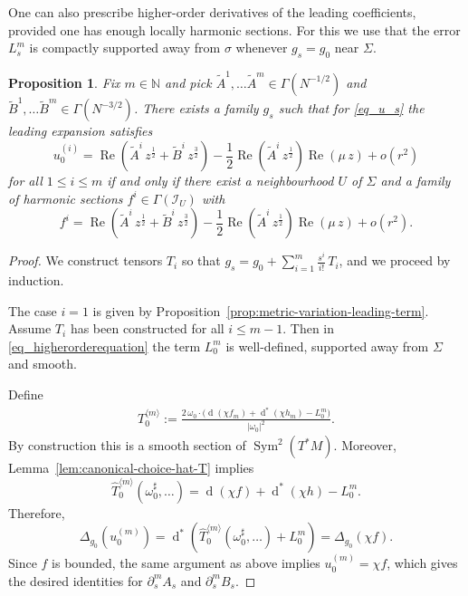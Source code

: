 \documentclass[11pt]{amsart}
\newcommand{\N}{\mathbb{N}}
\newcommand{\Sym}{\operatorname{Sym}}
\renewcommand{\d}{\operatorname{d}}
\renewcommand{\Re}{\operatorname{Re}}
\newtheorem{proposition}[theorem]{Proposition}
\begin{document}
One can also prescribe higher-order derivatives of the leading coefficients, provided one has enough locally harmonic sections. For this we use that the error $L^m_s$ is compactly supported away from $\sigma$ whenever $g_s = g_0$ near $\Sigma$.

\begin{proposition}
	\label{prop:higher-order-variation}
	Fix $m \in \N$ and pick \(\widetilde A^1, \ldots \widetilde A^m \in \Gamma(N^{-1/2})\) and \(\widetilde B^1, \ldots \widetilde B^m\in \Gamma(N^{-3/2})\). There exists a family \(g_s\) such that for \eqref{eq_u_s} the leading expansion satisfies
	\[
	u_0^{(i)} = \Re \left(\widetilde{A}^i \, z^{\frac{1}{2}} + \widetilde{B}^i \, z^{\frac{3}{2}}\right)
	- \frac{1}{2} \Re \left( \widetilde{A}^i\, z^{\frac{1}{2}}\right) \Re \left( \mu \, z\right)
	+ o(r^2)
	\]
	for all $1 \le i \le m$
	if and only if there exist a neighbourhood \(U\) of \(\Sigma\) and a family of harmonic sections \(f^i\in \Gamma(\mathcal I_U)\) with
	\[
	f^i = \Re \left(\widetilde A^i \, z^{\frac{1}{2}} + \widetilde B^i \, z^{\frac{3}{2}}\right)
	- \frac{1}{2} \Re \left( \widetilde  A^i\, z^{\frac{1}{2}}\right) \Re \left( \mu \, z\right)
	+ o(r^2).
	\]
\end{proposition}
\begin{proof}
	We construct tensors \(T_i\) so that $g_s = g_0+\sum_{i=1}^m \frac{s^i}{i!}\,T_i$, and we proceed by induction.
	
	The case \(i=1\) is given by Proposition~\ref{prop:metric-variation-leading-term}.
	Assume \(T_i\) has been constructed for all \(i\le m-1\).
	Then in \eqref{eq_higherorderequation} the term \(L_0^m\) is well-defined, supported away from $\Sigma$ and smooth.
	
	Define
	\begin{equation}
		\label{eq_explicit_formula_Tm}
		\begin{split}
				T^{\langle m\rangle}_0
			:= \frac{2\,\omega_0\cdot\bigl(\d(\chi f_m)+\d^*(\chi h_m)-L_0^m\bigr)}{|\omega_0|^2}.
		\end{split}
	\end{equation}
	By construction this is a smooth section of \(\Sym^2(T^*M)\).
	Moreover, Lemma~\ref{lem:canonical-choice-hat-T} implies
	\[
	\widehat T^{\langle m\rangle}_0(\omega_0^\sharp,\ldots)
	= \d(\chi f)+\d^*(\chi h)-L_0^m.
	\]
	Therefore,
	\[
	\Delta_{g_0}\left(u^{(m)}_0\right)
	= \d^*\!\left(\widehat T^{\langle m\rangle}_0(\omega_0^\sharp,\ldots)+L_0^m\right)
	= \Delta_{g_0}(\chi f).
	\]
	Since \(f\) is bounded, the same argument as above implies \(u^{(m)}_0=\chi f\), which gives the desired identities for \(\partial_s^m A_s\) and \(\partial_s^m B_s\).
\end{proof}
\end{document}
